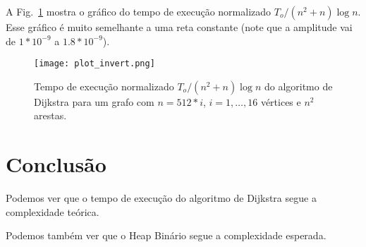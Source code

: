 \documentclass{article}
\begin{document}
A Fig.~\ref{fig2} mostra o gráfico do tempo de execução normalizado $T_o/(n^2+n)\log n$. Esse gráfico é muito semelhante a uma reta constante (note que a amplitude vai de $1*10 ^ {-9}$ a $1.8 * 10 ^ {-9}$).

\begin{figure}
  \centering
  \texttt{[image: plot\_invert.png]}
  \caption{Tempo de execução normalizado $T_o/(n^2+n)\log n$ do algoritmo de Dijkstra para um grafo com $n=512 * i$, $i=1,\ldots,16$ vértices e $n ^ 2$ arestas.}
  \label{fig2}
\end{figure}

\section{Conclusão}

Podemos ver que o tempo de execução do algoritmo de Dijkstra segue a complexidade teórica.

Podemos também ver que o Heap Binário segue a complexidade esperada.

\printbibliography
\end{document}
